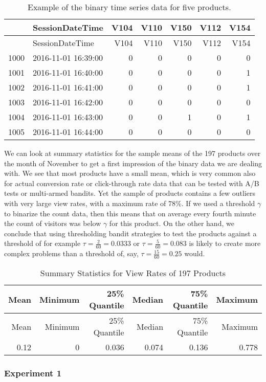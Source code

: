 \documentclass[11pt,]{article}
\begin{document}
\begin{longtable}[]{@{}llrrrrr@{}}
\caption{Example of the binary time series data for five
products.}\tabularnewline
\toprule
& SessionDateTime & V104 & V110 & V150 & V112 & V154\tabularnewline
\midrule
\endfirsthead
\toprule
& SessionDateTime & V104 & V110 & V150 & V112 & V154\tabularnewline
\midrule
\endhead
1000 & 2016-11-01 16:39:00 & 0 & 0 & 0 & 0 & 0\tabularnewline
1001 & 2016-11-01 16:40:00 & 0 & 0 & 0 & 0 & 1\tabularnewline
1002 & 2016-11-01 16:41:00 & 0 & 0 & 0 & 0 & 1\tabularnewline
1003 & 2016-11-01 16:42:00 & 0 & 0 & 0 & 0 & 0\tabularnewline
1004 & 2016-11-01 16:43:00 & 0 & 0 & 1 & 0 & 1\tabularnewline
1005 & 2016-11-01 16:44:00 & 0 & 0 & 0 & 0 & 0\tabularnewline
\bottomrule
\end{longtable}

\newpage

We can look at summary statistics for the sample means of the 197
products over the month of November to get a first impression of the
binary data we are dealing with. We see that most products have a small
mean, which is very common also for actual conversion rate or
click-through rate data that can be tested with A/B tests or multi-armed
bandits. Yet the sample of products contains a few outliers with very
large view rates, with a maximum rate of 78\%. If we used a threshold
\(\gamma\) to binarize the count data, then this means that on average
every fourth minute the count of visitors was below \(\gamma\) for this
product. On the other hand, we conclude that using thresholding bandit
strategies to test the products against a threshold of for example
\(\tau = \frac{2}{60} = 0.0333\) or \(\tau = \frac{5}{60} = 0.083\) is
likely to create more complex problems than a threshold of, say,
\(\tau = \frac{15}{60} = 0.25\) would.

\begin{longtable}[]{@{}rrrrrr@{}}
\caption{Summary Statistics for View Rates of 197
Products}\tabularnewline
\toprule
Mean & Minimum & 25\% Quantile & Median & 75\% Quantile &
Maximum\tabularnewline
\midrule
\endfirsthead
\toprule
Mean & Minimum & 25\% Quantile & Median & 75\% Quantile &
Maximum\tabularnewline
\midrule
\endhead
0.12 & 0 & 0.036 & 0.074 & 0.136 & 0.778\tabularnewline
\bottomrule
\end{longtable}

\subsubsection{Experiment 1}\label{experiment-1}
\end{document}
